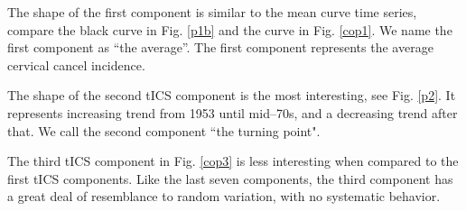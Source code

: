 \documentclass{llncs}
\begin{document}
 
\begin{figure}
     \centering
     \caption{}
     \label{tcomp}
\end{figure}

 
The shape of the first component is similar to the mean curve time series, compare the black curve  in Fig. \ref{p1b} and the curve in Fig. \ref{cop1}. We name the first component as  ``the average''. The first component represents the average cervical cancel incidence.

The shape of the second tICS component is the most interesting, see Fig. \ref{p2}. It represents increasing trend from 1953 until mid--70s, and a decreasing trend after that. We call the second component ``the turning point". 

The third tICS component in Fig. \ref{cop3} is less interesting when compared to the first  tICS components. Like the last seven components, the third component  has a great deal of resemblance to random variation, with no systematic behavior.
\end{document}
